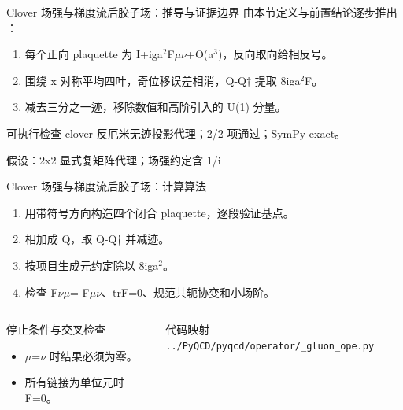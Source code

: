 \begin{frame}[t]{Clover 场强与梯度流后胶子场：推导与证据边界}
\footnotesize
{}\quad 由本节定义与前置结论逐步推出 ：
\begin{enumerate}
\item 每个正向 plaquette 为 I+iga\ensuremath{^{2}}F\ensuremath{\mu}\ensuremath{\nu}+O(a\ensuremath{^{3}})，反向取向给相反号。
\item 围绕 x 对称平均四叶，奇位移误差相消，Q-Q† 提取 8iga\ensuremath{^{2}}F。
\item 减去三分之一迹，移除数值和高阶引入的 U(1) 分量。
\end{enumerate}\begin{block}{可执行检查}
\quad clover 反厄米无迹投影代理；2/2 项通过；SymPy exact。
\par\scriptsize 假设：2x2 显式复矩阵代理；场强约定含 1/\allowbreak{}i
\end{block}
\end{frame}

\begin{frame}[t]{Clover 场强与梯度流后胶子场：计算算法}
\footnotesize
{}\begin{enumerate}
\item 用带符号方向构造四个闭合 plaquette，逐段验证基点。
\item 相加成 Q，取 Q-Q† 并减迹。
\item 按项目生成元约定除以 8iga\ensuremath{^{2}}。
\item 检查 F\ensuremath{\nu}\ensuremath{\mu}=-F\ensuremath{\mu}\ensuremath{\nu}、trF=0、规范共轭协变和小场阶。
\end{enumerate}\begin{columns}[T,onlytextwidth]
\begin{block}{停止条件与交叉检查}\scriptsize\begin{itemize}
\item[\CheckMark] \ensuremath{\mu}=\ensuremath{\nu} 时结果必须为零。
\item[\CheckMark] 所有链接为单位元时 F=0。
\end{itemize}\end{block}
\begin{block}{代码映射}
\scriptsize \texttt{.\allowbreak{}.\allowbreak{}/\allowbreak{}PyQCD/\allowbreak{}pyqcd/\allowbreak{}operator/\allowbreak{}\_\allowbreak{}gluon\_\allowbreak{}ope.\allowbreak{}py}
\end{block}\end{columns}\end{frame}

